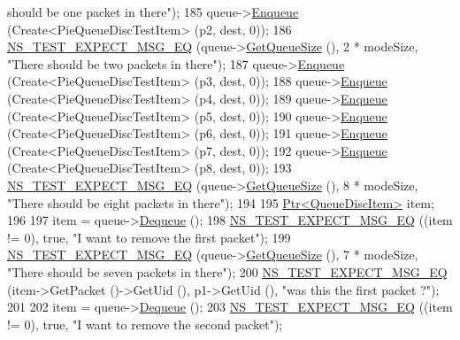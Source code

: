 \begin{DoxyCode}
{       should be one packet in there"});
185   queue->\hyperlink{classns3_1_1QueueDisc_af452fb01b98fed312125163f1fe85431}{Enqueue} (Create<PieQueueDiscTestItem> (p2, dest, 0));
186   \hyperlink{group__testing_ga7304ba46a28d8cf08dfdfd6499cf7068}{NS\_TEST\_EXPECT\_MSG\_EQ} (queue->\hyperlink{classns3_1_1PieQueueDisc_ae8675ca8d1c18d43ca678f30040e8510}{GetQueueSize} (), 2 * modeSize, \textcolor{stringliteral}{"There
       should be two packets in there"});
187   queue->\hyperlink{classns3_1_1QueueDisc_af452fb01b98fed312125163f1fe85431}{Enqueue} (Create<PieQueueDiscTestItem> (p3, dest, 0));
188   queue->\hyperlink{classns3_1_1QueueDisc_af452fb01b98fed312125163f1fe85431}{Enqueue} (Create<PieQueueDiscTestItem> (p4, dest, 0));
189   queue->\hyperlink{classns3_1_1QueueDisc_af452fb01b98fed312125163f1fe85431}{Enqueue} (Create<PieQueueDiscTestItem> (p5, dest, 0));
190   queue->\hyperlink{classns3_1_1QueueDisc_af452fb01b98fed312125163f1fe85431}{Enqueue} (Create<PieQueueDiscTestItem> (p6, dest, 0));
191   queue->\hyperlink{classns3_1_1QueueDisc_af452fb01b98fed312125163f1fe85431}{Enqueue} (Create<PieQueueDiscTestItem> (p7, dest, 0));
192   queue->\hyperlink{classns3_1_1QueueDisc_af452fb01b98fed312125163f1fe85431}{Enqueue} (Create<PieQueueDiscTestItem> (p8, dest, 0));
193   \hyperlink{group__testing_ga7304ba46a28d8cf08dfdfd6499cf7068}{NS\_TEST\_EXPECT\_MSG\_EQ} (queue->\hyperlink{classns3_1_1PieQueueDisc_ae8675ca8d1c18d43ca678f30040e8510}{GetQueueSize} (), 8 * modeSize, \textcolor{stringliteral}{"There
       should be eight packets in there"});
194 
195   \hyperlink{classns3_1_1Ptr}{Ptr<QueueDiscItem>} item;
196 
197   item = queue->\hyperlink{classns3_1_1QueueDisc_a6c13fc489822c1487f61c2289f2e3629}{Dequeue} ();
198   \hyperlink{group__testing_ga7304ba46a28d8cf08dfdfd6499cf7068}{NS\_TEST\_EXPECT\_MSG\_EQ} ((item != 0), \textcolor{keyword}{true}, \textcolor{stringliteral}{"I want to remove the first packet"});
199   \hyperlink{group__testing_ga7304ba46a28d8cf08dfdfd6499cf7068}{NS\_TEST\_EXPECT\_MSG\_EQ} (queue->\hyperlink{classns3_1_1PieQueueDisc_ae8675ca8d1c18d43ca678f30040e8510}{GetQueueSize} (), 7 * modeSize, \textcolor{stringliteral}{"There
       should be seven packets in there"});
200   \hyperlink{group__testing_ga7304ba46a28d8cf08dfdfd6499cf7068}{NS\_TEST\_EXPECT\_MSG\_EQ} (item->GetPacket ()->GetUid (), p1->GetUid (), \textcolor{stringliteral}{"was this the
       first packet ?"});
201 
202   item = queue->\hyperlink{classns3_1_1QueueDisc_a6c13fc489822c1487f61c2289f2e3629}{Dequeue} ();
203   \hyperlink{group__testing_ga7304ba46a28d8cf08dfdfd6499cf7068}{NS\_TEST\_EXPECT\_MSG\_EQ} ((item != 0), \textcolor{keyword}{true}, \textcolor{stringliteral}{"I want to remove the second packet"});

\end{DoxyCode}

